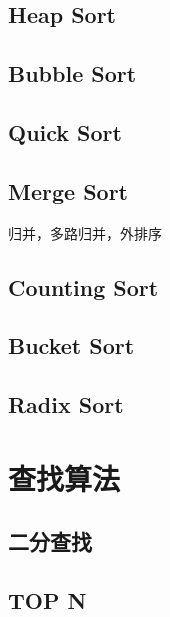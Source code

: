 \subsection{Heap Sort}

\subsection{Bubble Sort}

\subsection{Quick Sort}

\subsection{Merge Sort}

归并，多路归并，外排序

\subsection{Counting Sort}

\subsection{Bucket Sort}

\subsection{Radix Sort}

\section{查找算法}

\subsection{二分查找}

\subsection{TOP N}
